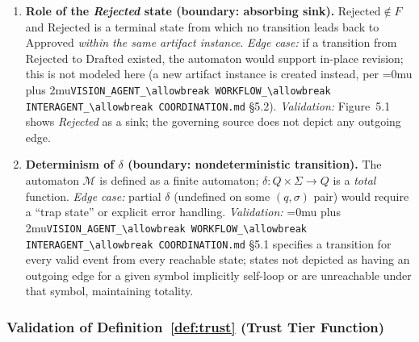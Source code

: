 \documentclass[12pt]{article}
\theoremstyle{definition}
\DeclareRobustCommand{\code}[1]{\begingroup\Urlmuskip=0mu plus 2mu\relax\nolinkurl{#1}\endgroup}
\newcommand{\VisionFlow}{\code{VISION\_AGENT\_\allowbreak WORKFLOW\_\allowbreak INTERAGENT\_\allowbreak COORDINATION.md}}
\begin{document}
\begin{enumerate}[label=\textbf{S\arabic*.}, leftmargin=*, widest=S9]
  \item \textbf{Role of the \textit{Rejected} state (boundary:
        absorbing sink).}
        $\mathrm{Rejected} \notin F$ and $\mathrm{Rejected}$ is a
        terminal state from which no transition leads back to
        $\mathrm{Approved}$ \emph{within the same artifact
        instance}.
        \emph{Edge case:} if a transition from $\mathrm{Rejected}$
        to $\mathrm{Drafted}$ existed, the automaton would support
        in-place revision; this is not modeled here (a new artifact
        instance is created instead, per \VisionFlow{} \S5.2).
        \emph{Validation:} Figure~5.1 shows \textit{Rejected} as a
        sink; the governing source does not depict any outgoing edge.

  \item \textbf{Determinism of $\delta$ (boundary: nondeterministic
        transition).}
        The automaton $\mathcal{M}$ is defined as a finite automaton;
        $\delta : Q \times \Sigma \to Q$ is a \emph{total} function.
        \emph{Edge case:} partial $\delta$ (undefined on some
        $(q, \sigma)$ pair) would require a ``trap state'' or
        explicit error handling.
        \emph{Validation:} \VisionFlow{} \S5.1 specifies a transition
        for every valid event from every reachable state; states not
        depicted as having an outgoing edge for a given symbol implicitly
        self-loop or are unreachable under that symbol, maintaining
        totality.

\end{enumerate}

\subsubsection{Validation of Definition~\ref{def:trust}
               (Trust Tier Function)}
\label{sec:val-trust}
\end{document}
